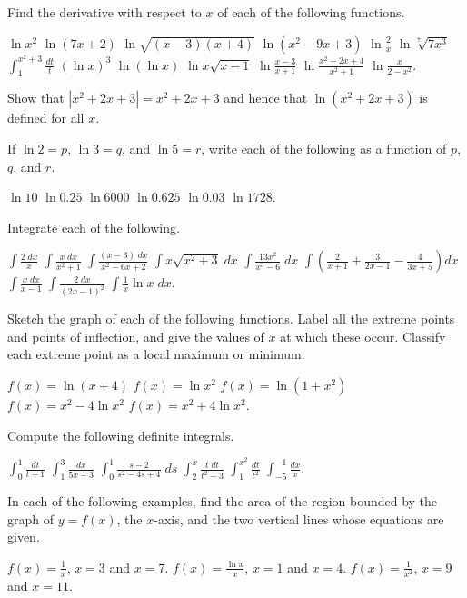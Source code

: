\begin{exercises}

Find the derivative with respect to $x$
of each of the following functions.
\begin{exenum}
\x
$\ln x^2$
\x
$\ln(7x + 2)$
\x
$\ln \sqrt{(x-3)(x+4)}$
\x
$\ln(x^2 - 9x + 3)$
\x
$\ln \frac{2}{x}$
\x
$\ln \sqrt[7]{7x^3}$
\x
$\int_1^{x^2+3} \frac{dt}t$
\x
$(\ln x)^3$
\x
$\ln(\ln x)$
\x
$\ln x\sqrt{x-1}$
\x
$\ln \frac{x-3}{x+1}$
\x
$\ln \frac{x^2-2x+4}{x^2+1}$
\x
$\ln \frac{x}{2-x^2}$.
\end{exenum}

Show that $|x^2 + 2x + 3| = x^2 + 2x + 3$ and hence that
$\ln(x^2 + 2x + 3)$ is defined for all $x$.

If $\ln 2 = p$, $\ln 3 = q$, and $\ln 5 = r$,
write each of the following as a function of
$p$, $q$, and $r$.
\begin{exenum}
\x
$\ln 10$
\x
$\ln 0.25$
\x
$\ln 6000$
\x
$\ln 0.625$
\x
$\ln 0.03$
\x
$\ln 1728$.
\end{exenum}

Integrate each of the following.
\begin{exenum}
\x
$\int \frac{2\;dx}x$
\x
$\int \frac{x\;dx}{x^2+1}$
\x
$\int \frac{(x-3)\;dx}{x^2-6x+2}$
\x
$\int x\sqrt{x^2+3}\;dx$
\x
$\int \frac{13x^2}{x^3-6}\;dx$
\x
$\int \left(\frac2{x+1} + \frac3{2x-1} - \frac4{3x+5}\right)dx$
\x
$\int \frac{x\;dx}{x-1}$
\x
$\int \frac{2\;dx}{(2x-1)^2}$
\x
$\int \frac1x \ln x\;dx$.
\end{exenum}

Sketch the graph of each of the following functions.
Label all the extreme points and points of inflection,
and give the values of $x$ at which these occur.
Classify each extreme point as a local maximum
or minimum.
\begin{exenum}
\x
$f(x) = \ln(x+4)$
\x
$f(x) = \ln x^2$
\x
$f(x) = \ln(1+x^2)$
\x
$f(x) = x^2 - 4 \ln x^2$
\x
$f(x) = x^2 + 4 \ln x^2$.
\end{exenum}

Compute the following definite integrals.
\begin{exenum}
\x
$\int_0^1 \frac{dt}{t+1}$
\x
$\int_1^3 \frac{dx}{5x-3}$
\x
$\int_0^1 \frac{s-2}{s^2-4s+4} \; ds$
\x
$\int_2^x \frac{t\;dt}{t^2-3}$
\x
$\int_1^{x^2} \frac{dt}{t^2}$
\x
$\int_{-5}^{-1} \frac{dx}x$.
\end{exenum}

In each of the following examples, find the area
of the region bounded by the graph of
$y = f(x)$, the $x$-axis, and the two vertical
lines whose equations are given.
\begin{exenum}
\x
$f(x) = \frac1x$, $x=3$ and $x=7$.
\x
$f(x) = \frac{\ln x}{x}$, $x=1$ and $x=4$.
\x
$f(x) = \frac1{x^2}$, $x=9$ and $x=11$.
\end{exenum}


\end{exercises}
